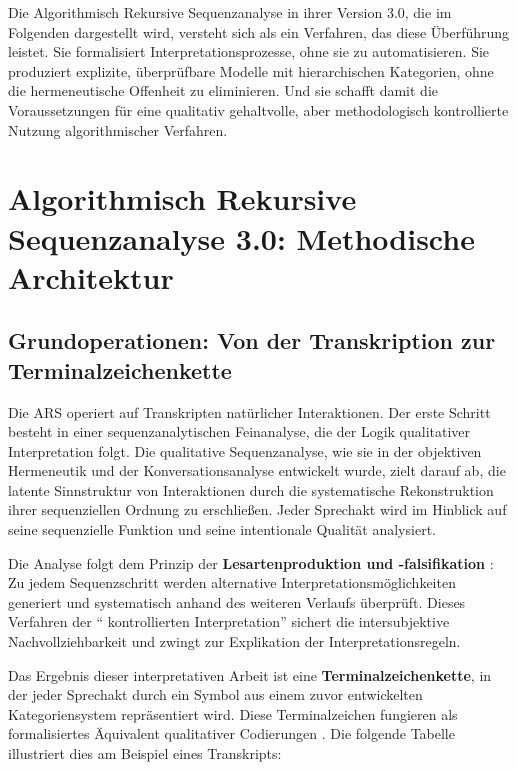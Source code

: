 \documentclass[
  12pt,
  a4paper,
  oneside,
  titlepage
]{article}
\begin{document}
Die Algorithmisch Rekursive Sequenzanalyse in ihrer Version 3.0, die im Folgenden 
dargestellt wird, versteht sich als ein Verfahren, das diese Überführung leistet. Sie 
formalisiert Interpretationsprozesse, ohne sie zu automatisieren. Sie produziert 
explizite, überprüfbare Modelle mit hierarchischen Kategorien, ohne die hermeneutische 
Offenheit zu eliminieren. Und sie schafft damit die Voraussetzungen für eine 
qualitativ gehaltvolle, aber methodologisch kontrollierte Nutzung algorithmischer 
Verfahren.

\section{Algorithmisch Rekursive Sequenzanalyse 3.0: Methodische Architektur}

\subsection{Grundoperationen: Von der Transkription zur Terminalzeichenkette}

Die ARS operiert auf Transkripten natürlicher Interaktionen. Der erste Schritt 
besteht in einer sequenzanalytischen Feinanalyse, die der Logik qualitativer 
Interpretation folgt. Die qualitative Sequenzanalyse, wie sie in der objektiven 
Hermeneutik \citep{Oevermann1979} und der Konversationsanalyse 
\citep{Sacks1974} entwickelt wurde, zielt darauf ab, die latente Sinnstruktur 
von Interaktionen durch die systematische Rekonstruktion ihrer sequenziellen 
Ordnung zu erschließen. Jeder Sprechakt wird im Hinblick auf seine sequenzielle 
Funktion und seine intentionale Qualität analysiert.

Die Analyse folgt dem Prinzip der \textbf{Lesartenproduktion und -falsifikation} 
\citep[ S.~392]{Oevermann1979}: Zu jedem Sequenzschritt werden alternative 
Interpretationsmöglichkeiten generiert und systematisch anhand des weiteren 
Verlaufs überprüft. Dieses Verfahren der \enquote{ kontrollierten Interpretation} 
\citep[ S.~158]{Flick2019} sichert die intersubjektive Nachvollziehbarkeit und 
zwingt zur Explikation der Interpretationsregeln.

Das Ergebnis dieser interpretativen Arbeit ist eine \textbf{Terminalzeichenkette}, 
in der jeder Sprechakt durch ein Symbol aus einem zuvor entwickelten 
Kategoriensystem repräsentiert wird. Diese Terminalzeichen fungieren als 
formalisiertes Äquivalent qualitativer Codierungen \citep[ S.~207]{Przyborski2021}. 
Die folgende Tabelle illustriert dies am Beispiel eines Transkripts:
\end{document}

